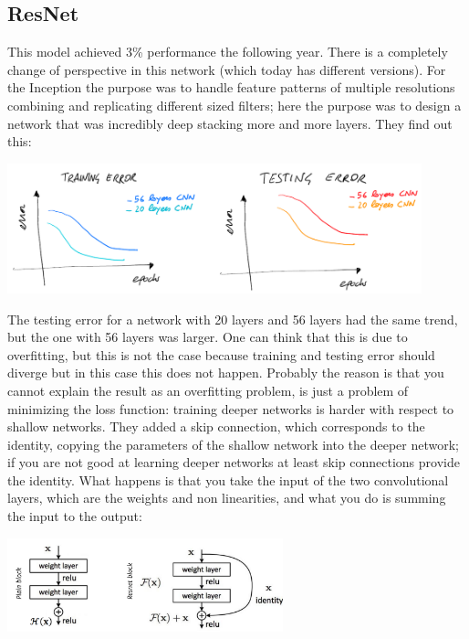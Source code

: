 \subsection{ResNet}
This model achieved 3\% performance the following year. There is a completely change of perspective in this network (which today has different versions). For the Inception the purpose was to handle feature patterns of multiple resolutions combining and replicating different sized filters; here the purpose was to design a network that was incredibly deep stacking more and more layers. They find out this:
\begin{center}
    \includegraphics[width=0.9\textwidth]{images/resnet_error.PNG}\par
\end{center}
The testing error for a network with 20 layers and 56 layers had the same trend, but the one with 56 layers was larger. One can think that this is due to overfitting, but this is not the case because training and testing error should diverge but in this case this does not happen. Probably the reason is that you cannot explain the result as an overfitting problem, is just a problem of minimizing the loss function: training deeper networks is harder with respect to shallow networks. They added a skip connection, which corresponds to the identity, copying the parameters of the shallow network into the deeper network; if you are not good at learning deeper networks at least skip connections provide the identity. What happens is that you take the input of the two convolutional layers, which are the weights and non linearities, and what you do is summing the input to the output:
\begin{center}
    \includegraphics[width=0.6\textwidth]{images/resnet_skip.PNG}\par
\end{center}
